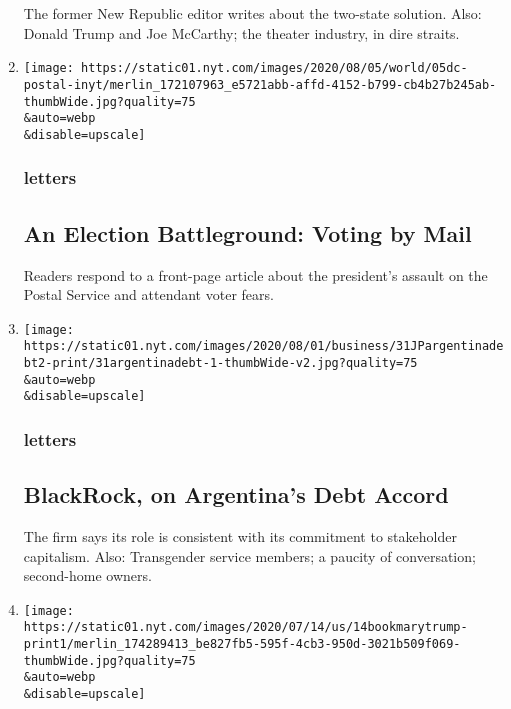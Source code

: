 \begin{enumerate}
  The former New Republic editor writes about the two-state solution.
  Also: Donald Trump and Joe McCarthy; the theater industry, in dire
  straits.
\item
  \href{/2020/08/05/opinion/letters/voting-mail.html}{}

  \texttt{[image: https://static01.nyt.com/images/2020/08/05/world/05dc-postal-inyt/merlin\_172107963\_e5721abb-affd-4152-b799-cb4b27b245ab-thumbWide.jpg?quality=75\\\&auto=webp\\\&disable=upscale]}

  \hypertarget{letters-5}{%
  \subsubsection{letters}\label{letters-5}}

  \hypertarget{an-election-battleground-voting-by-mail}{%
  \subsection{An Election Battleground: Voting by
  Mail}\label{an-election-battleground-voting-by-mail}}

  Readers respond to a front-page article about the president's assault
  on the Postal Service and attendant voter fears.
\item
  \href{/2020/08/04/opinion/letters/blackrock-argentina.html}{}

  \texttt{[image: https://static01.nyt.com/images/2020/08/01/business/31JPargentinadebt2-print/31argentinadebt-1-thumbWide-v2.jpg?quality=75\\\&auto=webp\\\&disable=upscale]}

  \hypertarget{letters-6}{%
  \subsubsection{letters}\label{letters-6}}

  \hypertarget{blackrock-on-argentinas-debt-accord}{%
  \subsection{BlackRock, on Argentina's Debt
  Accord}\label{blackrock-on-argentinas-debt-accord}}

  The firm says its role is consistent with its commitment to
  stakeholder capitalism. Also: Transgender service members; a paucity
  of conversation; second-home owners.
\item
  \href{/2020/08/04/opinion/letters/trump-family.html}{}

  \texttt{[image: https://static01.nyt.com/images/2020/07/14/us/14bookmarytrump-print1/merlin\_174289413\_be827fb5-595f-4cb3-950d-3021b509f069-thumbWide.jpg?quality=75\\\&auto=webp\\\&disable=upscale]}


\end{enumerate}
